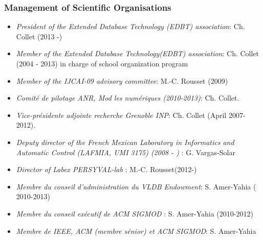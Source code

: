 \subsubsection*{Management of Scientific Organisations}

\begin{itemize}
\setlength{\itemindent}{-0.5cm}
\setlength{\itemsep}{-0.1cm}

\item {\it President of the Extended Database Technology (EDBT) association}: Ch. Collet (2013 -)

\item {\it Member of the Extended Database Technology(EDBT) association}: Ch. Collet (2004 - 2013) in charge of  school organization program

\item {\it Member of the IJCAI-09 advisory committee}: M.-C. Rousset (2009)

\item {\it Comit{\'e} de pilotage ANR, Mod les num{\'e}riques (2010-2013)}: Ch. Collet.

\item {\it Vice-pr{\'e}sidente adjointe recherche  Grenoble INP}: Ch. Collet (April 2007-2012).

\item {\it Deputy director of the French Mexican Laboratory in Informatics and Automatic Control (LAFMIA, UMI 3175) (2008 - ) }:  G. Vargas-Solar

\item {\it Director of Labex PERSYVAL-lab  }:  M.-C. Rousset(2012-)

\item \emph{Membre du conseil d'administration du VLDB Endowment}:  S. Amer-Yahia ( 2010-2013)

\item \emph{Membre du conseil ex\'ecutif de ACM SIGMOD }:  S. Amer-Yahia (2010-2012)

\item \emph{Membre de IEEE, ACM (membre s\'enior) et ACM SIGMOD}:  S. Amer-Yahia

\end{itemize}


